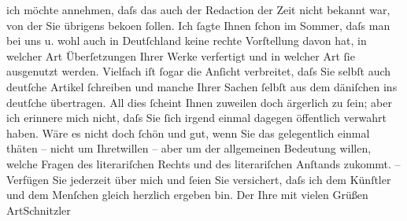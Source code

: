 \begin{ledgroupsized}[t]{13cm}
               ich möchte annehmen, daſs das auch der Redaction der Zeit nicht bekannt war, von der Sie übrigens \label{K_L00602_1v}\label{K_L00602_1h} beko{\geminationm}en
               ſollen. Ich ſagte Ihnen ſchon im Sommer, daſs man bei uns u. wohl auch in Deutſchland keine rechte Vorſtellung davon hat, in
               welcher Art Überſetzungen Ihrer Werke verfertigt und in welcher Art ſie ausgenutzt
               werden. Vielfach iſt ſogar die Anſicht verbreitet, daſs Sie selbſt auch deutſche
               Artikel ſchreiben und manche Ihrer Sachen ſelbſt aus dem däniſchen ins deutſche übertragen.\pend
           \pstart
           {\pb}All dies ſcheint Ihnen zuweilen doch ärgerlich zu
               ſein; aber ich erinnere mich nicht, daſs Sie ſich irgend einmal dagegen öffentlich
               verwahrt haben.\pend
           \pstart
           Wäre es nicht doch ſchön und gut, wenn Sie das gelegentlich einmal thäten – nicht um
               Ihretwillen – aber um der allgemeinen Bedeutung willen, welche Fragen des
               literariſchen Rechts und des literariſchen Anſtands zukommt. –\pend
           \pstart
           Verfügen Sie jederzeit über mich und ſeien Sie versichert, daſs ich dem Künſtler und
               dem Menſchen gleich herzlich ergeben bin.\pend
           \pstart Der Ihre mit vielen Grüßen \spacefill\mbox{ArtSchnitzler}\pend{}
         
         \endnumbering{}\end{ledgroupsized}  \newcommand{\dateiname}{L00602}\newcommand{\titel}{Arthur Schnitzler an Georg Brandes, 8. 10. 1896}\newcommand{\editorInnen}{Martin Anton Müller und Gerd-Hermann Susen}
      